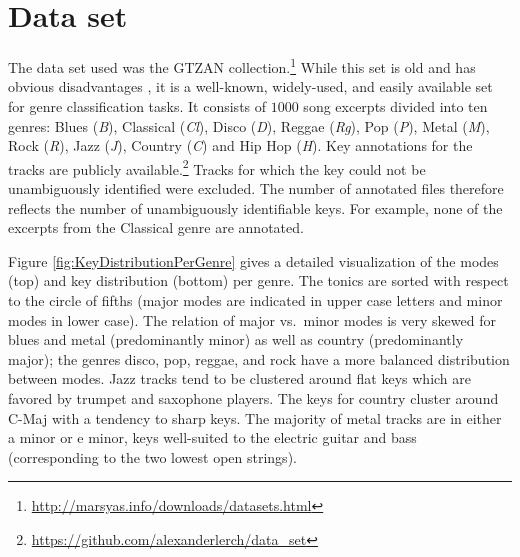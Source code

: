 \documentclass{article}
\begin{document}
\section{Data set}\label{sec:dataset}
The data set used was the GTZAN collection.\footnote{\url{http://marsyas.info/downloads/datasets.html}}
While this set
is old and has obvious disadvantages \cite{sturm_analysis_2012}, it is a well-known, widely-used, and easily available set for genre classification tasks. It consists of $1000$ song excerpts divided into ten genres: Blues (\textit{B}), Classical  (\textit{Cl}), Disco (\textit{D}), Reggae (\textit{Rg}), Pop (\textit{P}), Metal (\textit{M}), Rock (\textit{R}), Jazz (\textit{J}), Country (\textit{C}) and Hip Hop (\textit{H}). 
Key annotations for the tracks are publicly available.\footnote{\url{https://github.com/alexanderlerch/data_set}}%
Tracks for which the key could not be unambiguously identified were excluded. The number of annotated files therefore reflects the number of unambiguously identifiable keys.
For example, none of the excerpts from the Classical genre are annotated. 

Figure \ref{fig:KeyDistributionPerGenre} gives a detailed visualization of the modes (top) and key distribution (bottom) per genre. The tonics are sorted with respect to the circle of fifths (major modes are indicated in upper case letters and minor modes in lower case). 
The relation of major vs.\ minor modes is very skewed for blues and metal (predominantly minor) as well as country (predominantly major); the genres disco, pop, reggae, and rock have a more balanced distribution between modes. Jazz tracks tend to be clustered around flat keys which are favored by trumpet and saxophone players. The keys for country cluster around C-Maj with a tendency to sharp keys. The majority of metal tracks are in either a minor or e minor, keys well-suited to the electric guitar and bass (corresponding to the two lowest open strings).
\end{document}
